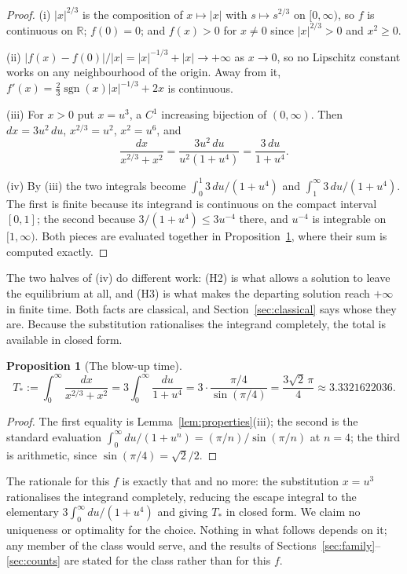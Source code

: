 \documentclass[12pt]{article}
\theoremstyle{plain}
\newtheorem{proposition}[theorem]{Proposition}
\theoremstyle{definition}
\theoremstyle{remark}
\newcommand{\R}{\mathbb{R}}
\DeclareMathOperator{\sgn}{sgn}
\begin{document}
\begin{proof}
(i) $|x|^{2/3}$ is the composition of $x\mapsto|x|$ with $s\mapsto s^{2/3}$ on
$[0,\infty)$, so $f$ is continuous on $\R$; $f(0)=0$; and $f(x)>0$ for $x\ne0$
since $|x|^{2/3}>0$ and $x^{2}\ge 0$.

(ii) $|f(x)-f(0)|/|x| = |x|^{-1/3}+|x| \to +\infty$ as $x\to 0$, so no Lipschitz
constant works on any neighbourhood of the origin. Away from it,
$f'(x)=\tfrac{2}{3}\sgn(x)|x|^{-1/3}+2x$ is continuous.

(iii) For $x>0$ put $x=u^{3}$, a $C^{1}$ increasing bijection of $(0,\infty)$.
Then $dx=3u^{2}\,du$, $x^{2/3}=u^{2}$, $x^{2}=u^{6}$, and
\[
  \frac{dx}{x^{2/3}+x^{2}}
  =\frac{3u^{2}\,du}{u^{2}(1+u^{4})}
  =\frac{3\,du}{1+u^{4}}.
\]

(iv) By (iii) the two integrals become $\int_{0}^{1}3\,du/(1+u^{4})$ and
$\int_{1}^{\infty}3\,du/(1+u^{4})$. The first is finite because its integrand is
continuous on the compact interval $[0,1]$; the second because
$3/(1+u^{4})\le 3u^{-4}$ there, and $u^{-4}$ is integrable on $[1,\infty)$. Both
pieces are evaluated together in Proposition~\ref{prop:Tstar}, where their sum is
computed exactly.
\end{proof}

The two halves of (iv) do different work: (H2) is what allows a solution to
leave the equilibrium at all, and (H3) is what makes the departing solution
reach $+\infty$ in finite time. Both facts are classical, and
Section~\ref{sec:classical} says whose they are. Because the substitution
rationalises the integrand completely, the total is available in closed form.

\begin{proposition}[The blow-up time]\label{prop:Tstar}
\[
  T_{*}:=\int_{0}^{\infty}\frac{dx}{x^{2/3}+x^{2}}
       = 3\int_{0}^{\infty}\frac{du}{1+u^{4}}
       = 3\cdot\frac{\pi/4}{\sin(\pi/4)}
       = \frac{3\sqrt{2}\,\pi}{4}
       \approx 3.3321622036 .
\]
\end{proposition}

\begin{proof}
The first equality is Lemma~\ref{lem:properties}(iii); the second is the
standard evaluation $\int_{0}^{\infty}du/(1+u^{n})=(\pi/n)/\sin(\pi/n)$ at
$n=4$; the third is arithmetic, since $\sin(\pi/4)=\sqrt2/2$.
\end{proof}

The rationale for this $f$ is exactly that and no more: the substitution
$x=u^{3}$ rationalises the integrand completely, reducing the escape integral to
the elementary $3\int_{0}^{\infty}du/(1+u^{4})$ and giving $T_{*}$ in closed
form. We claim no uniqueness or optimality for the choice. Nothing in what
follows depends on it; any member of the class would serve, and the results of
Sections~\ref{sec:family}--\ref{sec:counts} are stated for the class rather
than for this $f$.
\end{document}
